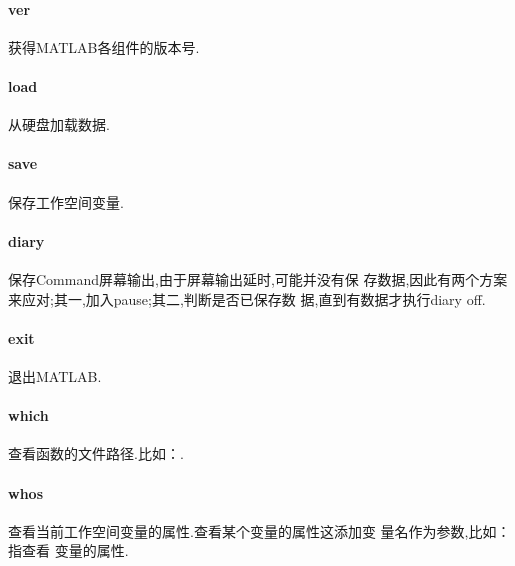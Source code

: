 \paragraph{ver} 获得MATLAB各组件的版本号.
\paragraph{load} 从硬盘加载数据.
\paragraph{save} 保存工作空间变量.
\paragraph{diary} 保存Command屏幕输出,由于屏幕输出延时,可能并没有保
存数据,因此有两个方案来应对;其一,加入pause;其二,判断是否已保存数
据,直到有数据才执行diary off.
\paragraph{exit} 退出MATLAB.
\paragraph{which} 查看函数的文件路径.比如：.
\paragraph{whos} 查看当前工作空间变量的属性.查看某个变量的属性这添加变
量名作为参数,比如： 指查看  变量的属性.